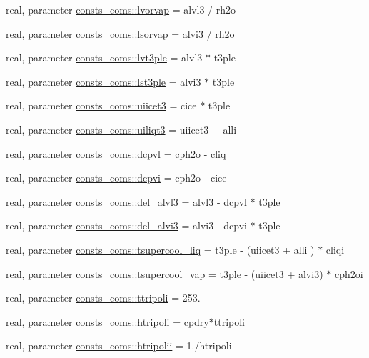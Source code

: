 \begin{DoxyCompactItemize}
real, parameter \hyperlink{namespaceconsts__coms_a6bb6a123479fd83c144d9fb138d78e6e}{consts\+\_\+coms\+::lvorvap} = alvl3 / rh2o
\item 
real, parameter \hyperlink{namespaceconsts__coms_acc7a981d4dc90ba43c3f6fe6188ebc22}{consts\+\_\+coms\+::lsorvap} = alvi3 / rh2o
\item 
real, parameter \hyperlink{namespaceconsts__coms_a1726b872fa55bc57ee0c68f0e60221f0}{consts\+\_\+coms\+::lvt3ple} = alvl3 $\ast$ t3ple
\item 
real, parameter \hyperlink{namespaceconsts__coms_a24b93259012881571e8873572d0e6a93}{consts\+\_\+coms\+::lst3ple} = alvi3 $\ast$ t3ple
\item 
real, parameter \hyperlink{namespaceconsts__coms_a4acdb50399e47f446b674d2ba133e667}{consts\+\_\+coms\+::uiicet3} = cice $\ast$ t3ple
\item 
real, parameter \hyperlink{namespaceconsts__coms_ab5c64cd18c9e5fddc92d34cbe5a75192}{consts\+\_\+coms\+::uiliqt3} = uiicet3 + alli
\item 
real, parameter \hyperlink{namespaceconsts__coms_a3d8b2bc618a2be7053f0eefeafff6646}{consts\+\_\+coms\+::dcpvl} = cph2o -\/ cliq
\item 
real, parameter \hyperlink{namespaceconsts__coms_a2469770a4505b267d92ea0c4c78ba886}{consts\+\_\+coms\+::dcpvi} = cph2o -\/ cice
\item 
real, parameter \hyperlink{namespaceconsts__coms_a809ce773fd38a8add21891c21a9a5e97}{consts\+\_\+coms\+::del\+\_\+alvl3} = alvl3 -\/ dcpvl $\ast$ t3ple
\item 
real, parameter \hyperlink{namespaceconsts__coms_ac5a0f650b4707f552ab22cd6365257c2}{consts\+\_\+coms\+::del\+\_\+alvi3} = alvi3 -\/ dcpvi $\ast$ t3ple
\item 
real, parameter \hyperlink{namespaceconsts__coms_ae511d0736cb1c546c00927c132cf9c9b}{consts\+\_\+coms\+::tsupercool\+\_\+liq} = t3ple -\/ (uiicet3 + alli ) $\ast$ cliqi
\item 
real, parameter \hyperlink{namespaceconsts__coms_a3872bd8b82e199fef7eb05add79a9a17}{consts\+\_\+coms\+::tsupercool\+\_\+vap} = t3ple -\/ (uiicet3 + alvi3) $\ast$ cph2oi
\item 
real, parameter \hyperlink{namespaceconsts__coms_a7a8253ab1b6ed9a65304dcabc61587dd}{consts\+\_\+coms\+::ttripoli} = 253.
\item 
real, parameter \hyperlink{namespaceconsts__coms_a823cf4f0ac3ad6922988b3dd8cb809d2}{consts\+\_\+coms\+::htripoli} = cpdry$\ast$ttripoli
\item 
real, parameter \hyperlink{namespaceconsts__coms_a5d4d8f013ab8c773c7a3c4417e67af03}{consts\+\_\+coms\+::htripolii} = 1./htripoli

\end{DoxyCompactItemize}
